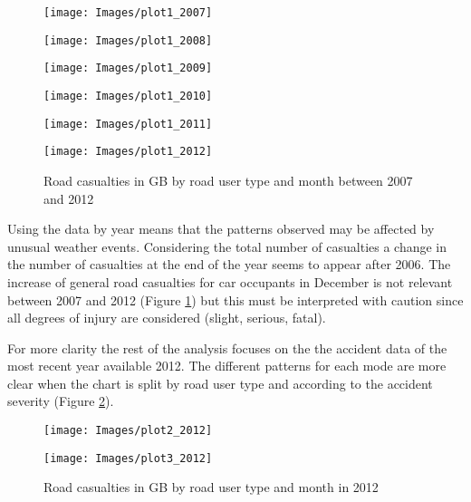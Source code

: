 \documentclass{article}
\begin{document}
\begin{figure}[H]
\begin{minipage}[H]{.46\linewidth}
  \centering
    \texttt{[image: Images/plot1\_2007]}
\end{minipage}
\hspace{1cm}
\begin{minipage}[H]{0.46\linewidth}
  \centering
     \texttt{[image: Images/plot1\_2008]}
\end{minipage}
\begin{minipage}[H]{.46\linewidth}
  \centering
    \texttt{[image: Images/plot1\_2009]}
\end{minipage}
\hspace{1cm}
\begin{minipage}[H]{0.46\linewidth}
  \centering
     \texttt{[image: Images/plot1\_2010]}
\end{minipage}
\begin{minipage}[H]{.46\linewidth}
  \centering
    \texttt{[image: Images/plot1\_2011]}
\end{minipage}
\hspace{1cm}
\begin{minipage}[H]{0.46\linewidth}
  \centering
     \texttt{[image: Images/plot1\_2012]}
\end{minipage}
\caption{Road casualties in GB by road user type and month between 2007 and 2012 }  
 \label{fig:2007-2012 }
\end{figure}


Using the data by year means that the patterns observed may be affected by unusual weather events. Considering the total number of casualties a change in the number of casualties at the end of the year seems to appear after 2006. The increase of general road casualties for car occupants in December is not relevant between 2007 and 2012 (Figure \ref{fig:2007-2012 }) but this must be interpreted with caution since all degrees of injury are considered (slight, serious, fatal). 


For more clarity the rest of the analysis focuses on the the accident data of the most recent year available 2012. The different patterns for each mode are more clear when the chart is split by road user type and according to the accident severity (Figure \ref{fig:plot2_2012}).


\begin{figure}[!h]
\hspace{-1cm}
\begin{minipage}[H]{.46\linewidth}
  \centering
    \texttt{[image: Images/plot2\_2012]}
\end{minipage}
\hspace{1cm}
\begin{minipage}[H]{0.46\linewidth}
  \centering
     \texttt{[image: Images/plot3\_2012]}
\end{minipage}
\caption{Road casualties in GB by road user type and month in 2012 }  
 \label{fig:plot2_2012}
 \end{figure}
 
\end{document}

